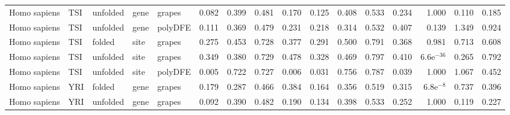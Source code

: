 \begin{longtable}{lllllrrrrrrrrrrr}
        Homo sapiens &                       TSI &  unfolded &  gene &   grapes &                              0.082 &                               0.399 &                 0.481 &                 0.170 &                              0.125 &                               0.408 &                 0.533 &                 0.234 &         1.000 &  0.110 &  0.185 \\
        Homo sapiens &                       TSI &  unfolded &  gene &  polyDFE &                              0.111 &                               0.369 &                 0.479 &                 0.231 &                              0.218 &                               0.314 &                 0.532 &                 0.407 &         0.139 &  1.349 &  0.924 \\
        Homo sapiens &                       TSI &    folded &  site &   grapes &                              0.275 &                               0.453 &                 0.728 &                 0.377 &                              0.291 &                               0.500 &                 0.791 &                 0.368 &         0.981 &  0.713 &  0.608 \\
        Homo sapiens &                       TSI &  unfolded &  site &   grapes &                              0.349 &                               0.380 &                 0.729 &                 0.478 &                              0.328 &                               0.469 &                 0.797 &                 0.410 &  6.6e$^{-36}$ &  0.265 &  0.792 \\
        Homo sapiens &                       TSI &  unfolded &  site &  polyDFE &                              0.005 &                               0.722 &                 0.727 &                 0.006 &                              0.031 &                               0.756 &                 0.787 &                 0.039 &         1.000 &  1.067 &  0.452 \\
        Homo sapiens &                       YRI &    folded &  gene &   grapes &                              0.179 &                               0.287 &                 0.466 &                 0.384 &                              0.164 &                               0.356 &                 0.519 &                 0.315 &   6.8e$^{-8}$ &  0.737 &  0.396 \\
        Homo sapiens &                       YRI &  unfolded &  gene &   grapes &                              0.092 &                               0.390 &                 0.482 &                 0.190 &                              0.134 &                               0.398 &                 0.533 &                 0.252 &         1.000 &  0.119 &  0.227 \\

\end{longtable}
